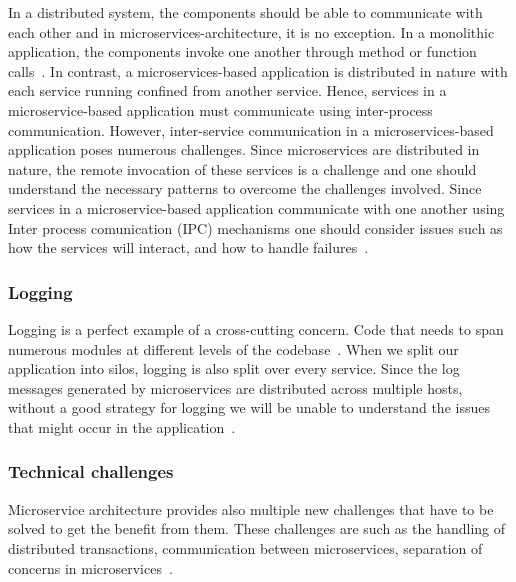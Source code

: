 \par In a distributed system, the components should be able to communicate with each other and in microservices-architecture, it is no exception. In a monolithic application, the components invoke one another through method or function calls~\cite{liu2018}. In contrast, a microservices-based application is distributed in nature with each service running confined from another service. Hence, services in a microservice-based application must communicate using inter-process communication. However, inter-service communication in a microservices-based application poses numerous challenges. Since microservices are distributed in nature, the remote invocation of these services is a challenge and one should understand the necessary patterns to overcome the challenges involved. Since services in a microservice-based application communicate with one another using Inter process comunication (IPC) mechanisms one should consider issues such as how the services will interact, and how to handle failures~\cite{Zhang2019}.


\subsubsection{Logging}%

Logging is a perfect example of a cross-cutting concern. Code that needs to span numerous modules at different levels of the codebase~\cite{Aaron2018}. When we split our application into silos, logging is also split over every service. Since the log messages generated by microservices are distributed across multiple hosts, without a good strategy for logging we will be unable to understand the issues that might occur in the application~\cite{Matt2016, Kalske2017,wang2020,Zhang2019}.

\subsubsection{Technical challenges}%

\par Microservice architecture provides also multiple new challenges that have to be solved to get the benefit from them. These challenges are such as the handling of distributed transactions, communication between microservices, separation of concerns in microservices~\cite{Kalske2017,KalskeM2017}.

